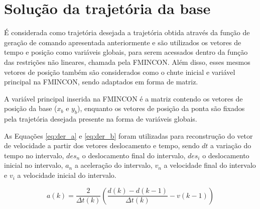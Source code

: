 
\section{Solução da trajetória da base}

É considerada como trajetória desejada a trajetória obtida através da função de geração de comando apresentada anteriormente
e são utilizados os vetores de tempo e posição como variáveis globais, para serem acessados dentro da função das
restrições não lineares, chamada pela FMINCON. Além disso, esses mesmos vetores de posição também são considerados como o chute inicial e variável principal
na FMINCON, sendo adaptados em forma de matriz.

A variável principal inserida na FMINCON é a matriz contendo os vetores de posição da base ($x_b$ e $y_b$),
enquanto os vetores de posição da ponta são fixados pela trajetória desejada presente na forma de variáveis globais.

As Equações \ref{eq:der_a} e \ref{eq:der_b} foram utilizadas para reconstrução do vetor de velocidade a partir dos vetores deslocamento e tempo, sendo $dt$ a variação do tempo no intervalo, $des_n$ o deslocamento final do intervalo, $des_i$ o deslocamento inicial no intervalo, $a_n$ a aceleração do intervalo, $v_n$ a velocidade final do intervalo e $v_i$ a velocidade inicial do intervalo. 


\begin{equation}
    \label{eq:der_a}      
        a(k) = \frac{2}{\Delta t(k)} \left( \frac{d(k)-d(k-1)}{\Delta t(k)}-v(k-1) \right)
\end{equation}

